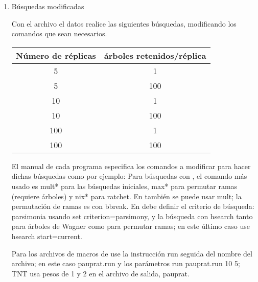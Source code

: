 \begin{itemize}
\begin{enumerate}
	  \item{B\'usquedas modificadas}

		Con el archivo el datos  realice las siguientes b\'usquedas,  modificando los comandos que sean necesarios.
 

 \begin{table}[H]
 \centering
 \begin{tabular}{|c|c|}
 \hline
  N\'umero de r\'eplicas & \'arboles retenidos/r\'eplica\\
 \hline
  5 & 1\\ 
   \hline
  5 & 100\\
   \hline 
  10& 1\\ 
   \hline
   10& 100\\
    \hline 
  100 & 1 \\
   \hline
   100 & 100 \\
  \hline
  
  
 \end{tabular}
 
 \end{table}
 
	El manual de cada programa especifica los comandos a modificar para hacer dichas b\'usquedas como por ejemplo: Para b\'usquedas con ,  el comando m\'as usado es mult*  para las b\'usquedas iniciales,   max*  para permutar ramas (requiere \'arboles) y nix*  para ratchet. En  tambi\'en se puede usar mult; la permutaci\'on de ramas es con bbreak.  En  debe definir el criterio de  b\'usqueda: parsimonia usando set criterion=parsimony,  y la b\'usqueda con hsearch tanto para \'arboles de Wagner como para permutar ramas; en este \'ultimo caso use hsearch start=current.

	Para los archivos de macros de  use la instrucci\'on run seguida del nombre del archivo; en este caso pauprat.run y los par\'ametros run pauprat.run 10 5; TNT usa pesos de 1 y 2 en el archivo de salida,  pauprat.
 
 





\end{enumerate}
\end{itemize}
